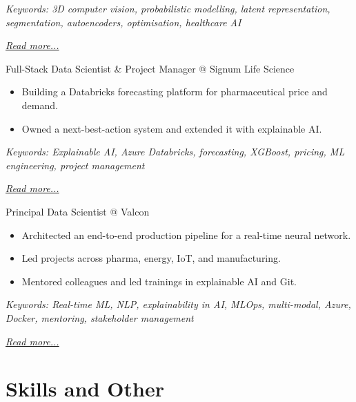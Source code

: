 \documentclass[11pt,a4paper]{moderncv}
\begin{document}
{\footnotesize\textit{Keywords: 3D computer vision, probabilistic modelling, latent representation, segmentation, autoencoders, optimisation, healthcare AI}}

\hfill{\small{\textit{\hyperref[sec:raysearch]{Read more...}}}}

\large{Full-Stack Data Scientist \& Project Manager @ Signum Life Science}
\normalsize
\begin{itemize}
    \item Building a Databricks forecasting platform for pharmaceutical price and demand.
    \item Owned a next-best-action system and extended it with explainable AI.
\end{itemize}

{\footnotesize\textit{Keywords: Explainable AI, Azure Databricks, forecasting, XGBoost, pricing, ML engineering, project management}}

\hfill{\small{\textit{\hyperref[sec:signum]{Read more...}}}}

\large{Principal Data Scientist @ Valcon}
\normalsize
\begin{itemize}
    \item Architected an end-to-end production pipeline for a real-time neural network.
    \item Led projects across pharma, energy, IoT, and manufacturing.
    \item Mentored colleagues and led trainings in explainable AI and Git.
\end{itemize}

{\footnotesize\textit{Keywords: Real-time ML, NLP, explainability in AI, MLOps, multi-modal, Azure, Docker, mentoring, stakeholder management}}

\hfill{\small{\textit{\hyperref[sec:valcon]{Read more...}}}}

\section{Skills and Other}
\normalsize
{}

\newpage
\end{document}
